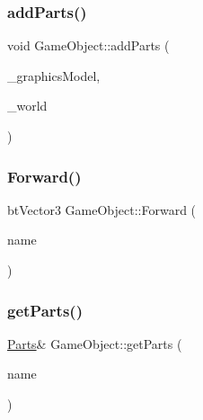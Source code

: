 \mbox{\label{class_game_object_a514b9b67d7173aba4ed28ddc3e38fd5f}} 
\subsubsection{\texorpdfstring{add\+Parts()}{addParts()}}
{\footnotesize\ttfamily void Game\+Object\+::add\+Parts (\begin{DoxyParamCaption}\item[{glt\+::\+Render\+\_\+\+Node \&}]{\+\_\+graphics\+Model,  }\item[{\mbox{\hyperlink{class_physics_world}{Physics\+World}} \&}]{\+\_\+world }\end{DoxyParamCaption})}

\mbox{\label{class_game_object_a2f7657dbdbe8be16d9ed9c4a4c1c2ef1}} 
\subsubsection{\texorpdfstring{Forward()}{Forward()}}
{\footnotesize\ttfamily bt\+Vector3 Game\+Object\+::\+Forward (\begin{DoxyParamCaption}\item[{const std\+::string \&}]{name }\end{DoxyParamCaption})}

\mbox{\label{class_game_object_a918e94af30ef96eb8a602cf8b0453758}} 
\subsubsection{\texorpdfstring{get\+Parts()}{getParts()}}
{\footnotesize\ttfamily \mbox{\hyperlink{struct_game_object_1_1_parts}{Parts}}\& Game\+Object\+::get\+Parts (\begin{DoxyParamCaption}\item[{const std\+::string \&}]{name }\end{DoxyParamCaption})\hspace{0.3cm}{\ttfamily [inline]}}

\mbox{\label{class_game_object_aed20b05219d7b5467dd1978d22fc3361}} 
